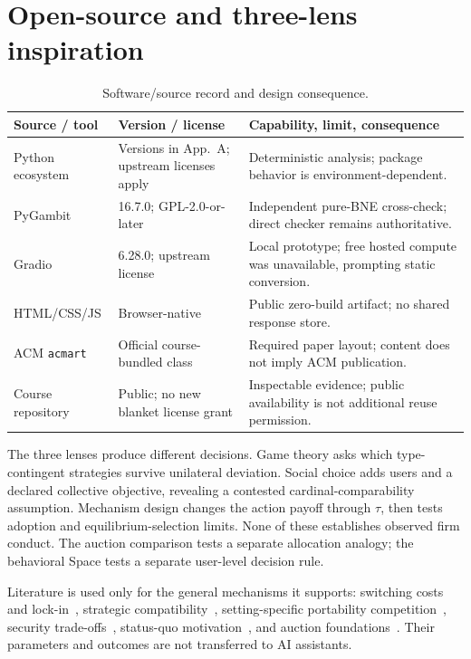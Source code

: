 \section{Open-source and three-lens inspiration}
\begin{table}[H]
\caption{Software/source record and design consequence.}
\footnotesize
\begin{tabularx}{\columnwidth}{@{}p{1.65cm}p{1.75cm}Y@{}}\toprule
\textbf{Source / tool}&\textbf{Version / license}&\textbf{Capability, limit, consequence}\\\midrule
Python ecosystem&Versions in App.~A; upstream licenses apply&Deterministic analysis; package behavior is environment-dependent.\\
PyGambit&16.7.0; GPL-2.0-or-later&Independent pure-BNE cross-check; direct checker remains authoritative.\\
Gradio&6.28.0; upstream license&Local prototype; free hosted compute was unavailable, prompting static conversion.\\
HTML/CSS/JS&Browser-native&Public zero-build artifact; no shared response store.\\
ACM \texttt{acmart}&Official course-bundled class&Required paper layout; content does not imply ACM publication.\\
Course repository&Public; no new blanket license grant&Inspectable evidence; public availability is not additional reuse permission.\\\bottomrule
\end{tabularx}
\end{table}

The three lenses produce different decisions. Game theory asks which type-contingent strategies survive unilateral deviation. Social choice adds users and a declared collective objective, revealing a contested cardinal-comparability assumption. Mechanism design changes the action payoff through $\tau$, then tests adoption and equilibrium-selection limits. None of these establishes observed firm conduct. The auction comparison tests a separate allocation analogy; the behavioral Space tests a separate user-level decision rule.

Literature is used only for the general mechanisms it supports: switching costs and lock-in~\cite{farrell2007coordination}, strategic compatibility~\cite{jeon2023compatibility}, setting-specific portability competition~\cite{viard2007switching}, security trade-offs~\cite{kim2026portability}, status-quo motivation~\cite{samuelson1988statusquo}, and auction foundations~\cite{vickrey1961counterspeculation,myerson1981optimal}. Their parameters and outcomes are not transferred to AI assistants.

